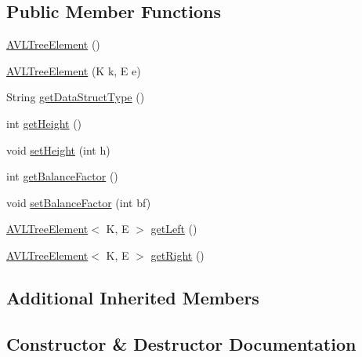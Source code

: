 \subsection*{Public Member Functions}
\begin{DoxyCompactItemize}
\item 
\hyperlink{classbridges_1_1base_1_1_a_v_l_tree_element_a8fe4490d3d5d16991736bd1a7243b904}{A\+V\+L\+Tree\+Element} ()
\item 
\hyperlink{classbridges_1_1base_1_1_a_v_l_tree_element_a060ec94b52675313ad15388e3f292df5}{A\+V\+L\+Tree\+Element} (K k, E e)
\item 
String \hyperlink{classbridges_1_1base_1_1_a_v_l_tree_element_abdd9e63de10732ef46bd5d531bd7f9d8}{get\+Data\+Struct\+Type} ()
\item 
int \hyperlink{classbridges_1_1base_1_1_a_v_l_tree_element_a52fe2886334c841547d238db69022697}{get\+Height} ()
\item 
void \hyperlink{classbridges_1_1base_1_1_a_v_l_tree_element_ac42b744989ed7e18dcbd52980e674b33}{set\+Height} (int h)
\item 
int \hyperlink{classbridges_1_1base_1_1_a_v_l_tree_element_a0478ca0351cd714e8f7b8e49703990c8}{get\+Balance\+Factor} ()
\item 
void \hyperlink{classbridges_1_1base_1_1_a_v_l_tree_element_a0dc3c83e750cc39535afb08ea92f6c98}{set\+Balance\+Factor} (int bf)
\item 
\hyperlink{classbridges_1_1base_1_1_a_v_l_tree_element}{A\+V\+L\+Tree\+Element}$<$ K, E $>$ \hyperlink{classbridges_1_1base_1_1_a_v_l_tree_element_a86f1329b19d2886ba7bf713e3844ecd6}{get\+Left} ()
\item 
\hyperlink{classbridges_1_1base_1_1_a_v_l_tree_element}{A\+V\+L\+Tree\+Element}$<$ K, E $>$ \hyperlink{classbridges_1_1base_1_1_a_v_l_tree_element_aab93418ac19605f2c7c57aa38d110921}{get\+Right} ()
\end{DoxyCompactItemize}
\subsection*{Additional Inherited Members}


\subsection{Constructor \& Destructor Documentation}
\hypertarget{classbridges_1_1base_1_1_a_v_l_tree_element_a8fe4490d3d5d16991736bd1a7243b904}{}
